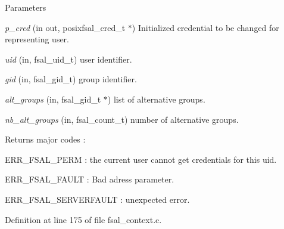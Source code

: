 \begin{DoxyParams}{Parameters}
\item[{\em p\_\-cred}](in out, posixfsal\_\-cred\_\-t $\ast$) Initialized credential to be changed for representing user. \item[{\em uid}](in, fsal\_\-uid\_\-t) user identifier. \item[{\em gid}](in, fsal\_\-gid\_\-t) group identifier. \item[{\em alt\_\-groups}](in, fsal\_\-gid\_\-t $\ast$) list of alternative groups. \item[{\em nb\_\-alt\_\-groups}](in, fsal\_\-count\_\-t) number of alternative groups.\end{DoxyParams}
\begin{DoxyReturn}{Returns}
major codes :
\begin{DoxyItemize}
\item ERR\_\-FSAL\_\-PERM : the current user cannot get credentials for this uid.
\item ERR\_\-FSAL\_\-FAULT : Bad adress parameter.
\item ERR\_\-FSAL\_\-SERVERFAULT : unexpected error. 
\end{DoxyItemize}
\end{DoxyReturn}


Definition at line 175 of file fsal\_\-context.c.